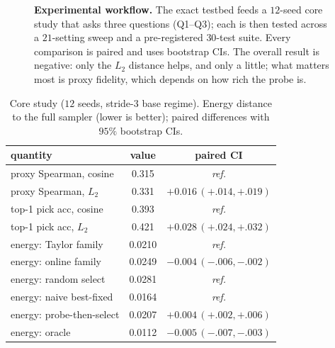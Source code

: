 \documentclass[10pt,twocolumn]{article}
\begin{document}
\begin{figure}[t]
{}
\caption{\textbf{Experimental workflow.} The exact testbed feeds a $12$-seed core study that
asks three questions (Q1--Q3); each is then tested across a $21$-setting sweep and a
pre-registered $30$-test suite. Every comparison is paired and uses bootstrap CIs. The
overall result is negative: only the $L_2$ distance helps, and only a little; what matters
most is proxy fidelity, which depends on how rich the probe is.}
\label{fig:flow}
\end{figure}

\begin{table}[t]\centering\small
\caption{Core study ($12$ seeds, stride-$3$ base regime). Energy distance to the full
sampler (lower is better); paired differences with $95\%$ bootstrap CIs.}
\label{tab:core}
\begin{tabular}{lcc}
\toprule
quantity & value & paired CI\\
\midrule
proxy Spearman, cosine & 0.315 & \textit{ref.}\\
proxy Spearman, $L_2$ & 0.331 & $+0.016\,(+.014,+.019)$\\
top-1 pick acc, cosine & 0.393 & \textit{ref.}\\
top-1 pick acc, $L_2$ & 0.421 & $+0.028\,(+.024,+.032)$\\
\midrule
energy: Taylor family & 0.0210 & \textit{ref.}\\
energy: online family & 0.0249 & $-0.004\,(-.006,-.002)$\\
\midrule
energy: random select & 0.0281 & \textit{ref.}\\
energy: naive best-fixed & 0.0164 & \textit{ref.}\\
energy: probe-then-select & 0.0207 & $+0.004\,(+.002,+.006)$\\
energy: oracle & 0.0112 & $-0.005\,(-.007,-.003)$\\
\bottomrule
\end{tabular}
\end{table}
\end{document}
